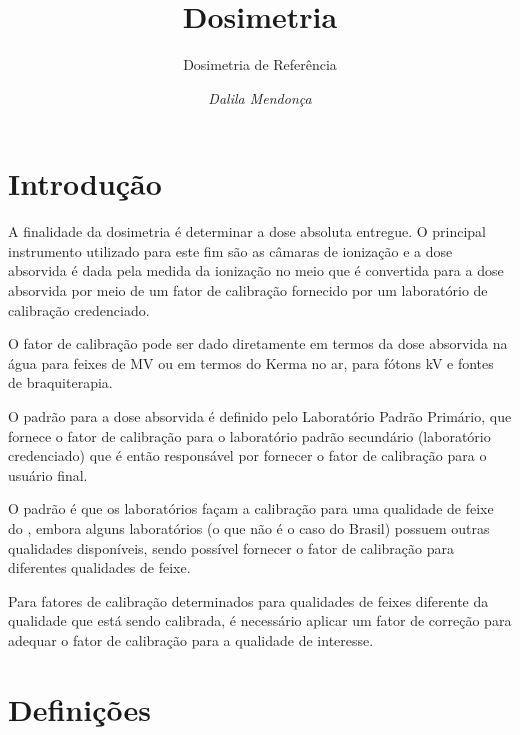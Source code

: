 \documentclass[11pt,a4paper]{article}
\title{\LobsterTwo\Huge{Dosimetria}}
\author{\LobsterTwo\Large{Dosimetria de Referência\nocite{*}}}
\date{\LobsterTwo\textit{Dalila Mendonça}}
\begin{document}
	\maketitle

    \section{Introdução}

    A finalidade da dosimetria é determinar a dose absoluta entregue.  O principal instrumento utilizado para este fim são as câmaras de ionização e a dose absorvida é dada pela medida da ionização no meio que é convertida para a dose absorvida por meio de um fator de calibração fornecido por um laboratório de calibração credenciado.

    O fator de calibração pode ser dado diretamente em termos da dose absorvida na água para feixes de MV ou em termos do Kerma no ar, para fótons kV e fontes de braquiterapia.

    O padrão para a dose absorvida é definido pelo Laboratório Padrão Primário, que fornece o fator de calibração para o laboratório padrão secundário (laboratório credenciado) que é então responsável por fornecer o fator de calibração para o usuário final.

    O padrão é que os laboratórios façam a calibração para uma qualidade de feixe do , embora alguns laboratórios (o que não é o caso do Brasil) possuem outras qualidades disponíveis, sendo possível fornecer o fator de calibração para diferentes qualidades de feixe. 

    Para fatores de calibração determinados para qualidades de feixes diferente da qualidade que está sendo calibrada, é necessário aplicar um fator de correção para adequar o fator de calibração para a qualidade de interesse.

	\section{Definições}
\end{document}
